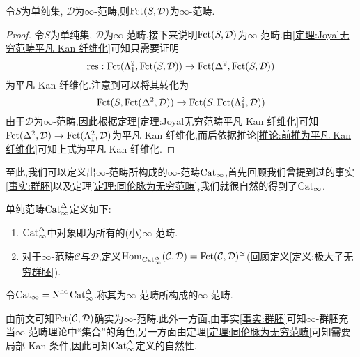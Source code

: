 \begin{theorem}
    令$S$为单纯集, $\mathcal{D}$为$\infty$-范畴,则$\operatorname{Fct}(S,\mathcal{D})$为$\infty$-范畴.
\end{theorem}
\begin{proof}
    令$S$为单纯集, $\mathcal{D}$为$\infty$-范畴.接下来说明$\operatorname{Fct}(S,\mathcal{D})$为$\infty$-范畴.由\ref{定理:Joyal无穷范畴平凡 Kan 纤维化}可知只需要证明
    \[
        \operatorname{res}: \operatorname{Fct}(\Lambda_1^2,\operatorname{Fct}(S,\mathcal{D}))\to \operatorname{Fct}(\Delta^2,\operatorname{Fct}(S,\mathcal{D}))
    \]
    为平凡 Kan 纤维化.注意到可以将其转化为
    \[
        \operatorname{Fct}(S,\operatorname{Fct}(\Delta^2,\mathcal{D})) \to \operatorname{Fct}(S,\operatorname{Fct}(\Lambda_1^2,\mathcal{D}))
    \]
    由于$\mathcal{D}$为$\infty$-范畴,因此根据定理\ref{定理:Joyal无穷范畴平凡 Kan 纤维化}可知$\operatorname{Fct}(\Delta^2,\mathcal{D})\to\operatorname{Fct}(\Lambda_1^2,\mathcal{D})$为平凡 Kan 纤维化,而后依据推论\ref{推论:前推为平凡 Kan 纤维化}可知上式为平凡 Kan 纤维化.
\end{proof}
至此,我们可以定义出$\infty$-范畴所构成的$\infty$-范畴$\Cat_{\infty}$,首先回顾我们曾提到过的事实\ref{事实:群胚}以及定理\ref{定理:同伦脉为无穷范畴},我们就很自然的得到了$\Cat_{\infty}$.
\begin{definition}[$\Cat_{\infty}$]
    单纯范畴$\operatorname{Cat}^{\Delta}_{\infty}$定义如下:
    \begin{enumerate}
        \item $\operatorname{Cat}^{\Delta}_{\infty}$中对象即为所有的(小)$\infty$-范畴.
        \item 对于$\infty$-范畴$\mathcal{C}$与$\mathcal{D}$,定义$\operatorname{Hom}_{\operatorname{Cat}_{\infty}^{\Delta}}(\mathcal{C},\mathcal{D}) = \operatorname{Fct}(\mathcal{C},\mathcal{D})^{\simeq}$(回顾定义\ref{定义:极大子无穷群胚}).
    \end{enumerate}
    令$\operatorname{Cat}_{\infty} = \operatorname{N}^{\operatorname{hc}} \operatorname{Cat}_{\infty}^{\Delta}$.称其为$\infty$-范畴所构成的$\infty$-范畴.
\end{definition}
\begin{remark}
    由前文可知$\operatorname{Fct}(\mathcal{C},\mathcal{D})$确实为$\infty$-范畴.此外一方面,由事实\ref{事实:群胚}可知$\infty$-群胚充当$\infty$-范畴理论中``集合''的角色,另一方面由定理\ref{定理:同伦脉为无穷范畴}可知需要局部 Kan 条件,因此可知$\operatorname{Cat}_{\infty}^{\Delta}$定义的自然性.
\end{remark}

